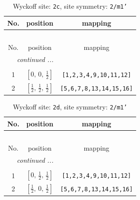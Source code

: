 \documentclass[fleqn,8pt]{jsarticle}
\begin{document}
\renewcommand{\arraystretch}{1.2}
\begin{longtable}{ccc}
\caption{Wyckoff site: {\tt 2c}, site symmetry: {\tt 2/m1'}}
 \\
 \hline \hline
No. & position & mapping \\ \hline \endfirsthead

\multicolumn{2}{l}{\tablename\ \thetable{}} \\
 \hline \hline
No. & position & mapping \\ \hline \endhead

 \hline \hline
\multicolumn{2}{r}{\footnotesize\it continued ...} \\ \endfoot

 \hline \hline
\multicolumn{2}{r}{} \\ \endlastfoot

1 & $\left[ 0,\, 0,\, \frac{1}{2} \right]$ & {\tt [1,2,3,4,9,10,11,12]} \\ \hline
2 & $\left[ \frac{1}{2},\, \frac{1}{2},\, \frac{1}{2} \right]$ & {\tt [5,6,7,8,13,14,15,16]} \\
\end{longtable}
\renewcommand{\arraystretch}{1.2}
\begin{longtable}{ccc}
\caption{Wyckoff site: {\tt 2d}, site symmetry: {\tt 2/m1'}}
 \\
 \hline \hline
No. & position & mapping \\ \hline \endfirsthead

\multicolumn{2}{l}{\tablename\ \thetable{}} \\
 \hline \hline
No. & position & mapping \\ \hline \endhead

 \hline \hline
\multicolumn{2}{r}{\footnotesize\it continued ...} \\ \endfoot

 \hline \hline
\multicolumn{2}{r}{} \\ \endlastfoot

1 & $\left[ 0,\, \frac{1}{2},\, \frac{1}{2} \right]$ & {\tt [1,2,3,4,9,10,11,12]} \\ \hline
2 & $\left[ \frac{1}{2},\, 0,\, \frac{1}{2} \right]$ & {\tt [5,6,7,8,13,14,15,16]} \\
\end{longtable}
\renewcommand{\arraystretch}{1.2}
\end{document}
